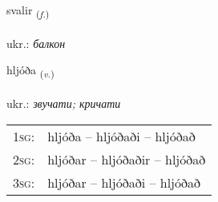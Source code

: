 \documentclass[frontgrid, backgrid]{flacards}\usepackage[]{graphicx}\usepackage[]{xcolor}
\begin{document}
\renewcommand{\flhead}{\vskip5pt \fboxsep=0pt {\small\bfseries\footnotesize Nafnorð | іменник}}
\renewcommand{\fcfoot}{\vskip5pt \fboxsep=0pt \hspace{2pt}{\small\bfseries\footnotesize 3K}}

\renewcommand{\blhead}{\vskip5pt {\small\bfseries\footnotesize Nafnorð | іменник }}
\renewcommand{\bcfoot}{\vskip5pt \hspace{2pt}{\small\bfseries\footnotesize 3K}}


{svalir \small{\textsubscript{(\textit{f.})}} \\[1ex] %
\textphonetic{[svaːlɪr]} \\
ukr.: \emph{балкон} \\  [2ex]
\renewcommand*{\arraystretch}{0.8}
}

\renewcommand{\flhead}{\vskip5pt \fboxsep=0pt {\small\bfseries\footnotesize Sagnorð | дієслово}}
\renewcommand{\fcfoot}{\vskip5pt \fboxsep=0pt \hspace{2pt}{\small\bfseries\footnotesize 3K}}

\renewcommand{\blhead}{\vskip5pt {\small\bfseries\footnotesize Sagnorð | дієслово }}
\renewcommand{\bcfoot}{\vskip5pt \hspace{2pt}{\small\bfseries\footnotesize 3K}}


{hljóða \small{\textsubscript{(\textit{v.})}} \\[1ex] %
\textphonetic{[l̥jouːða]} \\
ukr.: \emph{звучати; кричати} \\  [2ex]
\renewcommand*{\arraystretch}{0.8}
\begin{tabular}{p{1cm}l}
\textsc{1sg}: & hljóða -- hljóðaði -- hljóðað \\ 
\textsc{2sg}: & hljóðar -- hljóðaðir -- hljóðað \\ 
\textsc{3sg}: & hljóðar -- hljóðaði -- hljóðað \\ 
\end{tabular}
}
\end{document}
